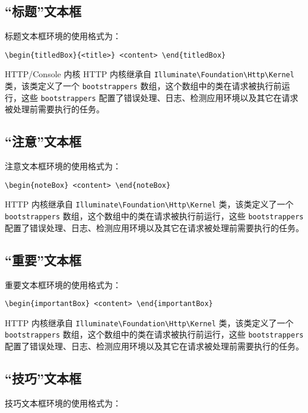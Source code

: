 \documentclass{nwafucoursepaper}
\begin{document}
\subsection{\enquote{标题}文本框}
标题文本框环境的使用格式为：

\verb|\begin{titledBox}{<title>} <content> \end{titledBox}|

\begin{titledBox}{HTTP/Console 内核}
  HTTP 内核继承自 \verb|Illuminate\Foundation\Http\Kernel| 类，该类定义了一个 \verb|bootstrappers| 数组，这个数组中的类在请求被执行前运行，这些 \verb|bootstrappers| 配置了错误处理、日志、检测应用环境以及其它在请求被处理前需要执行的任务。
\end{titledBox}
\subsection{\enquote{注意}文本框}
注意文本框环境的使用格式为：

\verb|\begin{noteBox} <content> \end{noteBox}|

\begin{noteBox}
  HTTP 内核继承自 \verb|Illuminate\Foundation\Http\Kernel| 类，该类定义了一个 \verb|bootstrappers| 数组，这个数组中的类在请求被执行前运行，这些 \verb|bootstrappers| 配置了错误处理、日志、检测应用环境以及其它在请求被处理前需要执行的任务。
\end{noteBox}

\subsection{\enquote{重要}文本框}
重要文本框环境的使用格式为：

\verb|\begin{importantBox} <content> \end{importantBox}|

\begin{importantBox}
  HTTP 内核继承自 \verb|Illuminate\Foundation\Http\Kernel| 类，该类定义了一个 \verb|bootstrappers| 数组，这个数组中的类在请求被执行前运行，这些 \verb|bootstrappers| 配置了错误处理、日志、检测应用环境以及其它在请求被处理前需要执行的任务。
\end{importantBox}
\subsection{\enquote{技巧}文本框}
技巧文本框环境的使用格式为：
\end{document}
